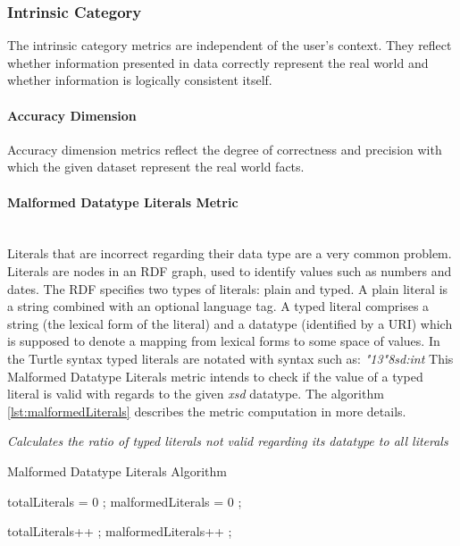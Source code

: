 
\subsubsection{Intrinsic Category}
\label{sec:Intrinsic}

The intrinsic category metrics are independent of the user's context.
They reflect whether information presented in data correctly represent the real world and whether information is logically consistent itself.

\paragraph{Accuracy Dimension} %
Accuracy dimension metrics reflect the degree of correctness and precision with which the given dataset represent the real world facts.

\paragraph{Malformed Datatype Literals Metric} ~\\ %
\label{par:malformed}
Literals that are incorrect regarding their data type are a very common problem.
Literals are nodes in an RDF graph, used to identify values such as numbers and dates.
The RDF specifies two types of literals: plain and typed.
A plain literal is a string combined with an optional language tag.
A typed literal comprises a string (the lexical form of the literal) and a datatype (identified by a URI) which is supposed to denote a mapping from lexical forms to some space of values.
In the Turtle syntax typed literals are notated with syntax such as: \textit{"13"^^xsd:int}
This Malformed Datatype Literals metric intends to check if the value of a typed literal is valid with regards to the given \textit{xsd} datatype.
The algorithm \ref{lst:malformedLiterals} describes the metric computation in more details.

\begin{mdframed}[style=metricdefinition]
\emph{Calculates the ratio of typed literals  not valid regarding its datatype to all literals}
\end{mdframed}

\begin{algorithm}
\caption{Malformed Datatype Literals Algorithm}\label{lst:malformedLiterals}
\begin{algorithmic}[1]
\State totalLiterals = 0 ;
\State malformedLiterals = 0 ;
\EndProcedure

 totalLiterals++ ;
 malformedLiterals++ ; \EndIf
 \EndIf
{}
\EndProcedure
\end{algorithmic}
\end{algorithm}

